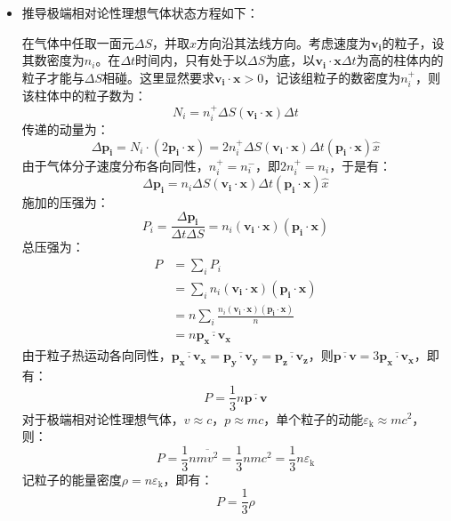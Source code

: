\documentclass[a4paper,fontset=none]{ctexart}
\begin{document}
    \begin{itemize}

        \item[\textbf{补充题}]
        推导极端相对论性理想气体状态方程如下：

        在气体中任取一面元$\Delta S$，并取$x$方向沿其法线方向。考虑速度为$\bm{v_i}$的粒子，设其数密度为$n_i$。在$\Delta t$时间内，只有处于以$\Delta S$为底，以$\bm{v_i}\cdot{\bm{x}}\Delta t$为高的柱体内的粒子才能与$\Delta S$相碰。这里显然要求$\bm{v_i}\cdot\bm{x} > 0$，记该组粒子的数密度为$n_i^+$，则该柱体中的粒子数为：
        \[
        N_i = n_i^+\Delta S(\bm{v_i}\cdot{\bm{x}})\Delta t
        \]
        传递的动量为：
        \[
        \Delta\bm{p_i} = N_i\cdot(2\bm{p_i}\cdot\bm{x}) = 2n_i^+\Delta S(\bm{v_i}\cdot{\bm{x}})\Delta t(\bm{p_i}\cdot\bm{x})\hat{x}
        \]
        由于气体分子速度分布各向同性，$n_i^+ = n_i^-$，即$2n_i^+ = n_i$，于是有：
        \[
        \Delta\bm{p_i} = n_i\Delta S(\bm{v_i}\cdot{\bm{x}})\Delta t(\bm{p_i}\cdot\bm{x})\hat{x}
        \]
        施加的压强为：
        \[
        P_i = \frac{\Delta\bm{p_i}}{\Delta t\Delta S} = n_i(\bm{v_i}\cdot{\bm{x}})(\bm{p_i}\cdot\bm{x})
        \]
        总压强为：
        \begin{align*}
            P
            &= \sum_i P_i \\
            &= \sum_i n_i(\bm{v_i}\cdot{\bm{x}})(\bm{p_i}\cdot\bm{x}) \\
            &= n\sum_i \frac{n_i(\bm{v_i}\cdot{\bm{x}})(\bm{p_i}\cdot\bm{x})}{n} \\
            &= n\overline{\bm{p_x}\cdot\bm{v_x}}
        \end{align*}
        由于粒子热运动各向同性，$\overline{\bm{p_x}\cdot\bm{v_x}} = \overline{\bm{p_y}\cdot\bm{v_y}} = \overline{\bm{p_z}\cdot\bm{v_z}}$，则$\overline{\bm{p}\cdot\bm{v}} = 3\overline{\bm{p_x}\cdot\bm{v_x}}$，即有：
        \[
        P = \frac{1}{3}n\overline{\bm{p}\cdot\bm{v}}
        \]
        对于极端相对论性理想气体，$v \approx c$，$p \approx mc$，单个粒子的动能$\varepsilon_\mathrm{k} \approx mc^2$，则：
        \[
        P = \frac{1}{3}n\overline{mv^2} = \frac{1}{3}nmc^2 = \frac{1}{3}n\varepsilon_\mathrm{k}
        \]
        记粒子的能量密度$\rho = n\varepsilon_\mathrm{k}$，即有：
        \[
        P = \frac{1}{3}\rho
        \]

    \end{itemize}
\end{document}
